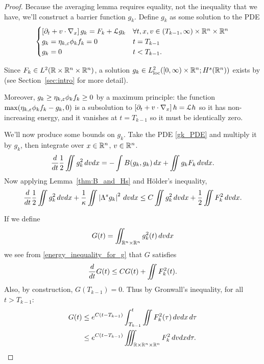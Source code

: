 \begin{proof}
Because the averaging lemma requires equality, not the inequality that we have, we'll construct a barrier function $g_k$.  Define $g_k$ as some solution to the PDE
\begin{equation}\begin{cases} \label{gk_PDE}
\left[ \partial_t + v\cdot \nabla_x \right] g_k = F_k + \mathcal{L} g_k & \forall t,x,v \in (T_{k-1},\infty) \times \mathbb{R}^n \times \mathbb{R}^n \\ 
g_k = \eta_{k,\varepsilon} \phi_k f_k = 0 & t = T_{k-1} \\
g_k = 0 & t < T_{k-1}.
\end{cases}\end{equation}

Since $F_k \in L^2(\mathbb{R}\times\mathbb{R}^n\times\mathbb{R}^n)$, a solution $g_k \in L^2_{\text{loc}}([0,\infty)\times \mathbb{R}^n; H^s(\mathbb{R}^n))$ exists by \cite{MoXu} (see Section~\ref{sec:intro} for more detail).  

Moreover, $g_k \geq \eta_{k,\varepsilon} \phi_k f_k \geq 0$ by a maximum principle: the function $\max(\eta_{k,\varepsilon} \phi_k f_k - g_k,0)$ is a subsolution to $\left[ \partial_t + v\cdot \nabla_x \right] h = \mathcal{L} h$ so it has non-increasing energy, and it vanishes at $t = T_{k-1}$ so it must be identically zero.  

We'll now produce some bounds on $g_k$.  Take the PDE \eqref{gk_PDE} and multiply it by $g_k$, then integrate over $x \in \mathbb{R}^n$, $v \in \mathbb{R}^n$.  
\[ \frac{d}{dt} \frac{1}{2}\iint g_k^2 \,dvdx = - \int B(g_k,g_k) \,dx + \iint g_k F_k \,dvdx. \]
Now applying Lemma~\ref{thm:B_and_Hs} and H\"{o}lder's inequality,
\begin{equation}\label{energy_inequality_for_g}
\frac{d}{dt} \frac{1}{2}\iint g_k^2 \,dvdx + \frac{1}{\kappa} \iint \left\lvert \Lambda^s g_k \right\rvert^2 \,dvdx \leq C \iint g_k^2 \,dvdx + \frac{1}{2}\iint F_k^2 \,dvdx. 
\end{equation}

If we define
\[ G(t) = \iint_{\mathbb{R}^n \times \mathbb{R}^n} g_k^2(t) \,dvdx \]
we see from \eqref{energy_inequality_for_g} that $G$ satisfies
\[ \frac{d}{dt} G(t) \leq C G(t) + \iint F_k^2(t). \]
Also, by construction, $G(T_{k-1}) = 0$.  Thus by Gronwall's inequality, for all $t > T_{k-1}$:
\begin{align*} 
G(t) &\leq e^{C(t-T_{k-1})} \int_{T_{k-1}}^t \iint F_k^2(\tau) \,dvdx \,d\tau
\\ &\leq e^{C(t-T_{k-1})} \iiint_{\mathbb{R}\times\mathbb{R}^n\times\mathbb{R}^n} F_k^2 \,dvdxd\tau.
\end{align*}


\end{proof}
